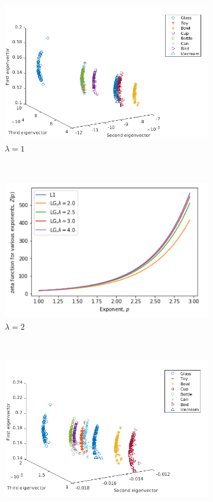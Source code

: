 \documentclass[10pt,a4paper]{article}
\theoremstyle{plain}
\theoremstyle{definition}
\begin{document}
\begin{figure}[H]
	\centering
	\begin{subfigure}[b]{0.5\textwidth}
		\includegraphics[width= \textwidth]{images/Zeta-Laplace1.png}
		\caption{$\lambda=1$}
		\label{}
	\end{subfigure}~
	\begin{subfigure}[b]{0.5\textwidth}
		\includegraphics[width= \textwidth]{images/Zeta-Laplace2.png}
		\caption{$\lambda=2$}
		\label{}
	\end{subfigure}\\
	\begin{subfigure}[b]{0.5\textwidth}
		\includegraphics[width= \textwidth]{images/Zeta-Laplace4.png}

\end{subfigure}
\end{figure}
\end{document}
